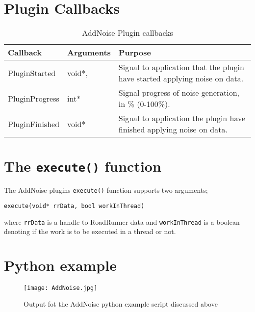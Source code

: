 \section{Plugin Callbacks}
\begin{table}[ht]
\centering %
\begin{tabular}{l l p{7.5cm}} %

Callback & Arguments & Purpose \\ [0.5ex] %
\hline %
PluginStarted  	& 	void*, & Signal to application that the plugin have started applying noise on data. \\
PluginProgress	& 	int*  & Signal progress of noise generation, in \% (0-100\%). \\
PluginFinished	& 	void* & Signal to application the plugin have finished applying noise on data. \\

\hline %
\end{tabular}
\caption{AddNoise Plugin callbacks} 
\label{table:AddNoisePluginCallBacks} 
\end{table}

\section{The \texttt{execute()} function}
The AddNoise plugins \verb|execute()| function supports two arguments;

\verb|execute(void* rrData, bool workInThread)|

where \verb|rrData| is a handle to RoadRunner data and \verb|workInThread| is a boolean denoting if the work is to be executed in a thread or not.

\section{Python example}

\begin{singlespace}

\end{singlespace}

\begin{figure}[H]
\centering
\texttt{[image: AddNoise.jpg]}
\caption{Output fot the AddNoise python example script discussed above}
\label{fig:addNoiseFig}
\end{figure}





